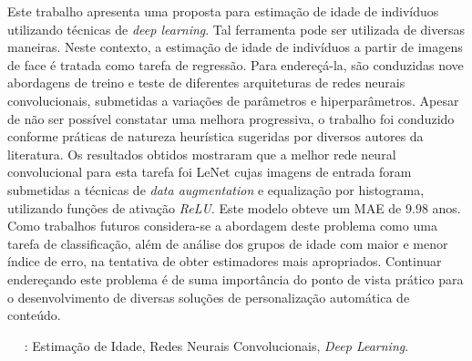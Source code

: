 
  Este trabalho apresenta uma proposta para estimação de idade de indivíduos utilizando técnicas de \emph{deep learning}. Tal ferramenta pode ser utilizada de diversas maneiras. Neste contexto, a estimação de idade de indivíduos a partir de imagens de face é tratada como tarefa de regressão. Para endereçá-la, são conduzidas nove abordagens de treino e teste de diferentes arquiteturas de redes neurais convolucionais, submetidas a variações de parâmetros e hiperparâmetros. Apesar de não ser possível constatar uma melhora progressiva, o trabalho foi conduzido conforme práticas de natureza heurística sugeridas por diversos autores da literatura. Os resultados obtidos mostraram que a melhor rede neural convolucional para esta tarefa foi LeNet cujas imagens de entrada foram submetidas a técnicas de \emph{data augmentation} e equalização por histograma, utilizando funções de ativação \emph{ReLU}. Este modelo obteve um MAE de $9.98$ anos. Como trabalhos futuros considera-se a abordagem deste problema como uma tarefa de classificação, além de análise dos grupos de idade com maior e menor índice de erro, na tentativa de obter estimadores mais apropriados. Continuar endereçando este problema é de suma importância do ponto de vista prático para o desenvolvimento de diversas soluções de personalização automática de conteúdo.


  \ \ \newline
  : Estimação de Idade, Redes Neurais Convolucionais, \emph{Deep Learning}.
